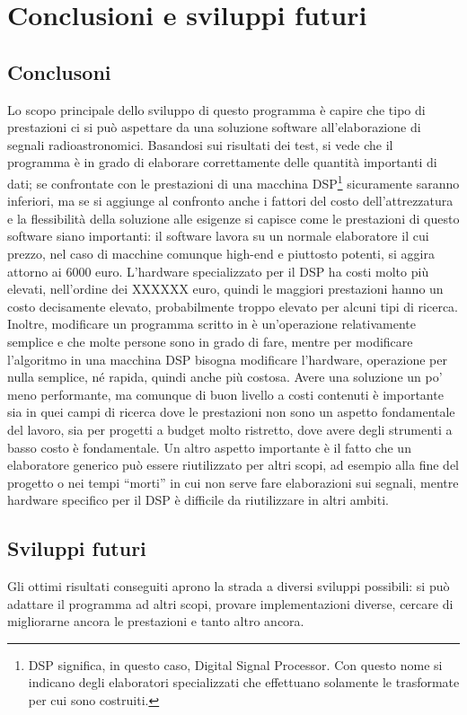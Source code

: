 \chapter{Conclusioni e sviluppi futuri}
\label{conclusions}
\section{Conclusoni}
Lo scopo principale dello sviluppo di questo programma \`e capire che tipo di
prestazioni ci si pu\`o aspettare da una soluzione software all'elaborazione di
segnali radioastronomici. Basandosi sui risultati dei test, si vede che il
programma \`e in grado di elaborare correttamente delle quantit\`a importanti di
dati; se confrontate con le prestazioni di una macchina DSP\footnote{DSP
    significa, in questo caso, Digital Signal Processor. Con questo nome si
    indicano degli elaboratori specializzati che effettuano solamente le
    trasformate per cui sono costruiti.} sicuramente saranno inferiori, ma se si
aggiunge al confronto anche i fattori del costo dell'attrezzatura e la
flessibilità della soluzione alle esigenze si capisce come le prestazioni di
questo software siano importanti: il software lavora su un normale elaboratore
il cui prezzo, nel caso di macchine comunque high-end e piuttosto potenti, si
aggira attorno ai 6000 euro. L'hardware specializzato per il DSP ha costi molto
pi\`u elevati, nell'ordine dei XXXXXX euro, quindi le maggiori prestazioni
hanno un costo decisamente elevato, probabilmente troppo elevato per alcuni tipi
di ricerca. Inoltre, modificare un programma scritto in \CC \`e un'operazione
relativamente semplice e che molte persone sono in grado di fare, mentre per
modificare l'algoritmo in una macchina DSP bisogna modificare l'hardware,
operazione per nulla semplice, n\'e rapida, quindi anche pi\`u costosa. Avere
una soluzione un po' meno performante, ma comunque di buon livello a costi
contenuti \`e importante sia in quei campi di ricerca dove le prestazioni non
sono un aspetto fondamentale del lavoro, sia per progetti a budget molto
ristretto, dove avere degli strumenti a basso costo \`e fondamentale.
Un altro aspetto importante \`e il fatto che un elaboratore generico pu\`o
essere riutilizzato per altri scopi, ad esempio alla fine del progetto o nei
tempi ``morti'' in cui non serve fare elaborazioni sui segnali, mentre hardware
specifico per il DSP \`e difficile da riutilizzare in altri ambiti.

\section{Sviluppi futuri}
Gli ottimi risultati conseguiti aprono la strada a diversi sviluppi possibili:
si può adattare il programma ad altri scopi, provare implementazioni diverse,
cercare di migliorarne ancora le prestazioni e tanto altro ancora.
